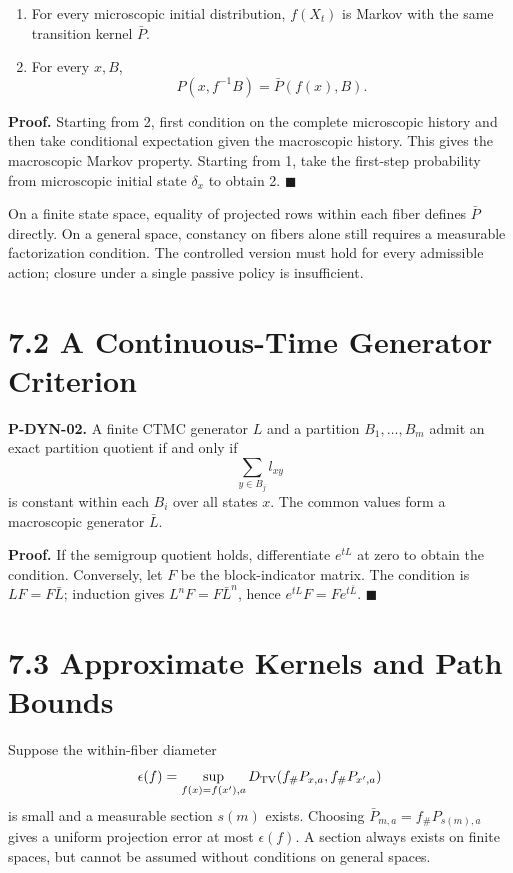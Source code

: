 \documentclass[
  english,
  11pt,
  oneside]{book}
\providecommand{\tightlist}{%
  \setlength{\itemsep}{0pt}\setlength{\parskip}{0pt}}
\begin{document}
\begin{enumerate}
\def\labelenumi{\arabic{enumi}.}
\tightlist
\item
  For every microscopic initial distribution, \(f(X_t)\) is Markov with the same transition kernel \(\bar P\).
\item
  For every \(x,B\), \[P(x,f^{-1}B)=\bar P(f(x),B).\]
\end{enumerate}

\textbf{Proof.} Starting from 2, first condition on the complete microscopic history and then take conditional expectation given the macroscopic history. This gives the macroscopic Markov property. Starting from 1, take the first-step probability from microscopic initial state \(\delta_x\) to obtain 2. \(\blacksquare\)

On a finite state space, equality of projected rows within each fiber defines \(\bar P\) directly. On a general space, constancy on fibers alone still requires a measurable factorization condition. The controlled version must hold for every admissible action; closure under a single passive policy is insufficient.

\section{7.2 A Continuous-Time Generator Criterion}\label{a-continuous-time-generator-criterion}

\hypertarget{p-dyn-02}{}\label{p-dyn-02}

\textbf{P-DYN-02.} A finite CTMC generator \(L\) and a partition \(B_1,\ldots,B_m\) admit an exact partition quotient if and only if \[\sum_{y\in B_j}l_{xy}\] is constant within each \(B_i\) over all states \(x\). The common values form a macroscopic generator \(\bar L\).

\textbf{Proof.} If the semigroup quotient holds, differentiate \(e^{tL}\) at zero to obtain the condition. Conversely, let \(F\) be the block-indicator matrix. The condition is \(LF=F\bar L\); induction gives \(L^nF=F\bar L^n\), hence \(e^{tL}F=Fe^{t\bar L}\). \(\blacksquare\)

\section{7.3 Approximate Kernels and Path Bounds}\label{approximate-kernels-and-path-bounds}

Suppose the within-fiber diameter \[\epsilon(f)=\sup_{f(x)=f(x'),a}
D_{\rm TV}(f_\#P_{x,a},f_\#P_{x',a})\] is small and a measurable section \(s(m)\) exists. Choosing \(\bar P_{m,a}=f_\#P_{s(m),a}\) gives a uniform projection error at most \(\epsilon(f)\). A section always exists on finite spaces, but cannot be assumed without conditions on general spaces.
\end{document}
